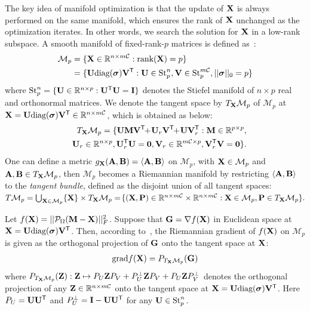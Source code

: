 \documentclass[letterpaper]{article} %
\def\ranksym{p}
\def\symp{r}
\def\calP{\mathcal{P}}
\def\M{\mathcal{M}}
\def\R{{\mathbb R}}
\def\U{{\bf U}}
\def\V{{\bf V}}
\def\diag{\mbox{diag}}
\def\bsigma{\mbox{{\boldmath $\sigma$}}}
\def\trsp{{\sf T}}
\def\I{{\bf I}}
\def\0{{\bf 0}}
\def\G{{\bf G}}
\def\grad{{\text{grad}}}
\def\bZ{{\bf Z}}
\def\bB{{\bf B}}
\def\bM{{\bf M}}
\def\calC{{\mathcal{C}}}
\def\bX{{\bf X}}
\def\bA{{\bf A}}
\def\bX{{\bf X}}
\def\bP{{\bf P}}
\def\rank{{\text{rank}}}
\begin{document}
The key idea of manifold optimization is that the update of $\bX$ is always performed on the same manifold, which ensures the rank of $\bX$ unchanged as the optimization iterates.
In other words, we search the solution for $\bX$ in a low-rank subspace.
A smooth manifold of fixed-rank-$\ranksym$ matrices is defined as~\cite{vandereycken2013lowrank}:
{\small
\begin{align}
\M_{\ranksym} &= \{\bX\in \R^{n\times m\calC}: \rank(\bX) = \ranksym\} \nonumber \\
       &= \{\U\diag(\bsigma)\V^{\trsp}: \U \in \textrm{St}_{\ranksym}^{n}, \V \in
           \textrm{St}_{\ranksym}^{m\calC}, ||\bsigma||_0 = \ranksym\} \nonumber
\end{align}
}
\noindent
where $\textrm{St}_{\ranksym}^{n} = \{\U \in \R^{n\times \ranksym}:
\U^{\trsp}\U = \I \}$ denotes the Stiefel manifold of $n \times \ranksym$ real and orthonormal matrices.
We denote the tangent space by $T_{\bX}\M_{\ranksym}$ of $\M_{\ranksym}$ at $\bX = \U\diag(\bsigma)\V^{\trsp} \in \R^{n \times m\calC}$,
which is obtained as below:
{\small
\begin{align}
\label{eq:tangent_vector}
&&T_{\bX}\M_{\ranksym} =  \{\U\bM\V^{\trsp} \!\!+\! \U_{\symp} \V^{\trsp} \!\!+\!
\U\V_{\symp}^{\trsp}: \bM \in \R^{\ranksym \times \ranksym}, \nonumber\\ && \U_{\symp} \in \R^{n\times \ranksym},
\U_{\symp}^{\trsp}\U = \0, \V_{\symp} \in \R^{m\calC \times \ranksym}, \V_{\symp}^{\trsp}\V = \0\}.
\end{align}
}
\noindent
One can define a metric $g_{\bX}({\bA},{\bB}) = \langle{\bA},{\bB}\rangle$ on $\M_{\ranksym}$,
with $\bX \in \M_{\ranksym}$ and ${\bA},{\bB} \in T_{\bX}\M_{\ranksym}$,
then $\M_{\ranksym}$ becomes a Riemannian manifold by restricting
$\langle\bA,\bB\rangle$
to the \emph{tangent bundle}, defined as the disjoint union of all tangent spaces:
$T\M_{\ranksym} = \bigcup_{\bX\in \M_{\ranksym}}\{\bX\} \times T_{\bX}\M_{\ranksym}
         = \! \{(\bX,\bP)\in \R^{n \times m\calC} \times \R^{n \times m\calC}: \bX \in \M_{\ranksym}, \bP \in T_{\bX}\M_{\ranksym}\}.$


Let $f(\bX) = ||\calP_{\Omega} (\bM - \bX) ||_F^2$.
Suppose that $\G = \nabla f(\bX)$ in Euclidean space at $\bX = \U\diag(\bsigma)\V^{\trsp}$.
Then, according to~\cite{vandereycken2013lowrank}, the Riemannian gradient of $f(\bX)$ on $\M_\ranksym$ is given as the orthogonal
projection of $\G$ onto the tangent space at $\bX$:
{\small
\begin{eqnarray}\label{eq:grad}
\grad{f(\bX)} = P_{T_{\bX}\M_{\ranksym}}(\G)
\end{eqnarray}
}
\noindent
where
$P_{T_{\bX}\M_{\ranksym}}(\bZ): \bZ \mapsto P_{U}\bZ P_{V} + P_{U}^{\perp} \bZ P_{V} + P_{U} \bZ P_{V}^{\perp}$
denotes the orthogonal projection of any
$\bZ \in \R^{n \times m\calC}$ onto the tangent space at $\bX = \U\diag(\bsigma)\V^{\trsp}$.
Here $P_U = \U \U^{\trsp}$ and $P_U^{\perp} = \I - \U \U^{\trsp}$ for any $\U \in \textrm{St}_{\ranksym}^{n}$.
\end{document}
